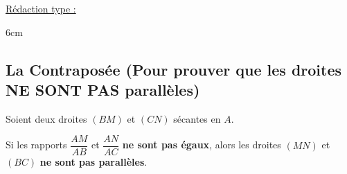 \documentclass[a4paper]{book}
\begin{document}
\begin{exemple}
\begin{minipage}[t]{0.45\textwidth}
        \end{minipage}
        \hfill \vline \hfill
        \begin{minipage}[t]{0.50\textwidth}
            \underline{Rédaction type :}
            \begin{ZoneReponse}{6cm}
            \end{ZoneReponse}
        \end{minipage}
    \end{exemple}


\vspace{2cm}
    
    
\subsection{La Contraposée (Pour prouver que les droites NE SONT PAS parallèles)}

    
    \begin{propriete}
        Soient deux droites $(BM)$ et $(CN)$ sécantes en $A$.
        
        Si les rapports $\dfrac{AM}{AB}$ et $\dfrac{AN}{AC}$ \textbf{ne sont pas égaux}, alors les droites $(MN)$ et $(BC)$ \textbf{ne sont pas parallèles}.
    \end{propriete}
    
\end{document}
